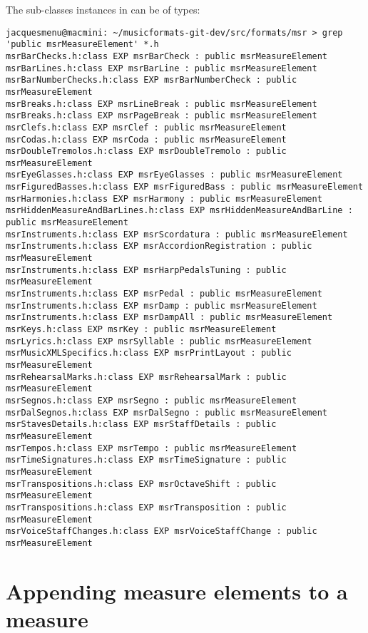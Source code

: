 The  sub-classes instances in {\tt } can be of types:
\begin{lstlisting}[language=Terminal]
jacquesmenu@macmini: ~/musicformats-git-dev/src/formats/msr > grep 'public msrMeasureElement' *.h
msrBarChecks.h:class EXP msrBarCheck : public msrMeasureElement
msrBarLines.h:class EXP msrBarLine : public msrMeasureElement
msrBarNumberChecks.h:class EXP msrBarNumberCheck : public msrMeasureElement
msrBreaks.h:class EXP msrLineBreak : public msrMeasureElement
msrBreaks.h:class EXP msrPageBreak : public msrMeasureElement
msrClefs.h:class EXP msrClef : public msrMeasureElement
msrCodas.h:class EXP msrCoda : public msrMeasureElement
msrDoubleTremolos.h:class EXP msrDoubleTremolo : public msrMeasureElement
msrEyeGlasses.h:class EXP msrEyeGlasses : public msrMeasureElement
msrFiguredBasses.h:class EXP msrFiguredBass : public msrMeasureElement
msrHarmonies.h:class EXP msrHarmony : public msrMeasureElement
msrHiddenMeasureAndBarLines.h:class EXP msrHiddenMeasureAndBarLine : public msrMeasureElement
msrInstruments.h:class EXP msrScordatura : public msrMeasureElement
msrInstruments.h:class EXP msrAccordionRegistration : public msrMeasureElement
msrInstruments.h:class EXP msrHarpPedalsTuning : public msrMeasureElement
msrInstruments.h:class EXP msrPedal : public msrMeasureElement
msrInstruments.h:class EXP msrDamp : public msrMeasureElement
msrInstruments.h:class EXP msrDampAll : public msrMeasureElement
msrKeys.h:class EXP msrKey : public msrMeasureElement
msrLyrics.h:class EXP msrSyllable : public msrMeasureElement
msrMusicXMLSpecifics.h:class EXP msrPrintLayout : public msrMeasureElement
msrRehearsalMarks.h:class EXP msrRehearsalMark : public msrMeasureElement
msrSegnos.h:class EXP msrSegno : public msrMeasureElement
msrDalSegnos.h:class EXP msrDalSegno : public msrMeasureElement
msrStavesDetails.h:class EXP msrStaffDetails : public msrMeasureElement
msrTempos.h:class EXP msrTempo : public msrMeasureElement
msrTimeSignatures.h:class EXP msrTimeSignature : public msrMeasureElement
msrTranspositions.h:class EXP msrOctaveShift : public msrMeasureElement
msrTranspositions.h:class EXP msrTransposition : public msrMeasureElement
msrVoiceStaffChanges.h:class EXP msrVoiceStaffChange : public msrMeasureElement
\end{lstlisting}


\section{Appending measure elements to a measure}

